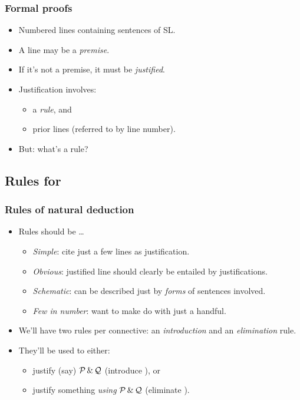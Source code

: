 \begin{frame}
  \frametitle{Formal proofs}

  \begin{itemize}[<+->]
    \item Numbered lines containing sentences of SL.
    \item A line may be a \emph{premise}.
    \item If it's not a premise, it must be \emph{justified}.
    \item Justification involves:
      \begin{itemize}
        \item a \emph{rule}, and
        \item prior lines (referred to by line number).
      \end{itemize}
    \item But: what's a rule?
  \end{itemize}
\end{frame}

\subsection{Rules for \eand}

\begin{frame}
  \frametitle{Rules of natural deduction}

  \begin{itemize}[<+->]
    \item Rules should be \dots
      \begin{itemize}[<+->]
        \item \emph{Simple}: cite just a few lines as justification.
        \item \emph{Obvious}: justified line should clearly be entailed by justifications.
        \item \emph{Schematic}: can be described just by \emph{forms} of
        sentences involved.
        \item \emph{Few in number}: want to make do with just a handful.
      \end{itemize}
    \item We'll have two rules per connective: an \emph{introduction}
    and an \emph{elimination} rule.
    \item They'll be used to either:
    \begin{itemize}[<+->]
      \item justify (say) $\mathcal{P} \,\&\, \mathcal{Q}$
    (introduce \eand), or 
    \item justify something \emph{using} $\mathcal{P}
    \,\&\, \mathcal{Q}$ (eliminate \eand).
    \end{itemize}
  \end{itemize}
\end{frame}

